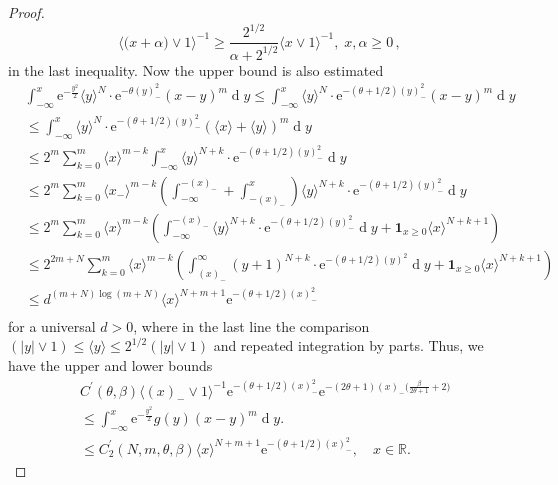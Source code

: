 \documentclass[11pt, reqno]{amsart}
\numberwithin{equation}{section}
\newcommand{\R}{\ensuremath{\mathbb{R}}}
\newcommand{\diff}{\ensuremath{\operatorname{d}\!}}
\begin{document}
\begin{proof}
    \[
    \langle \big(x+\alpha\big)\lor 1 \rangle ^{-1}\ge \frac{2^{1/2}}{\alpha +  2^{1/2}}\langle x\lor 1 \rangle ^{-1} ,\; x,\alpha \ge 0\,,
    \]
    in the last inequality. Now the upper bound is also estimated
    \begin{align*}
         &\displaystyle\int^x_{-\infty}\mathrm{e}^{-\frac{y^2}{2}}\langle y\rangle^{N}\cdot \mathrm{e}^{-\theta(y)^2_-}(x-y)^m\diff y \le  \displaystyle\int^x_{-\infty}\langle y\rangle^{N}\cdot \mathrm{e}^{-(\theta+1/2)(y)^2_-}(x-y)^m\diff y\\
         & \le \displaystyle\int^x_{-\infty}\langle y\rangle^{N}\cdot \mathrm{e}^{-(\theta+1/2)(y)^2_-}(\langle x\rangle+\langle y\rangle)^m\diff y\\
         & \le 2^m\displaystyle \sum_{k=0}^m \langle x\rangle^{m-k}\displaystyle\int^x_{-\infty}\langle y\rangle^{N+k}\cdot \mathrm{e}^{-(\theta+1/2)(y)^2_-}\diff y\\
         & \le 2^m\displaystyle \sum_{k=0}^m \langle x_-\rangle^{m-k}\left(\displaystyle\int^{-(x)_-}_{-\infty}+\displaystyle\int^x_{-(x)_-}\right)\langle y\rangle^{N+k}\cdot \mathrm{e}^{-(\theta+1/2)(y)^2_-}\diff y\\
         & \le 2^m\displaystyle \sum_{k=0}^m \langle x\rangle^{m-k}\left(\displaystyle\int^{-(x)_-}_{-\infty}\langle y\rangle^{N+k}\cdot \mathrm{e}^{-(\theta+1/2)(y)^2_-}\diff y+ \mathbf{1}_{x\ge 0}\langle x\rangle^{N+k+1}\right) \\
         & \le 2^{2m+N}\displaystyle \sum_{k=0}^m \langle x\rangle^{m-k}\left(\displaystyle\int^{\infty}_{(x)_-}(y+1)^{N+k}\cdot \mathrm{e}^{-(\theta+1/2)(y)^2}\diff y + \mathbf{1}_{x\ge 0}\langle x\rangle^{N+k+1}\right) \\
         &\le d^{(m+N)\log (m+N)} \langle x\rangle^{N+m+1} \mathrm{e}^{-(\theta+1/2)(x)_-^2}\\
    \end{align*}
      for a universal $d>0$, where in the last line the comparison $(|y|\lor1)\le \langle y\rangle \le 2^{1/2}(|y|\lor 1)$ and repeated integration by parts. Thus, we have the upper and lower bounds
    \begin{align*}
          & C^\prime(\theta, \beta)\langle (x)_-\lor 1 \rangle ^{-1} \mathrm{e}^{-(\theta + 1/2)(x)_-^2}\mathrm{e}^{-(2\theta + 1)(x)_-\big(\frac{\beta}{2\theta +1}+ 2\big)}\\
          & \le\displaystyle\int^x_{-\infty}\mathrm{e}^{-\frac{y^2}{2}}g(y)(x-y)^m\diff y. \\
         & \le C^\prime_2(N, m, \theta, \beta)\langle x\rangle ^{N+m+1}\mathrm{e}^{-(\theta+1/2)(x)_-^2},\quad x\in \R.

\end{align*}
\end{proof}
\end{document}
